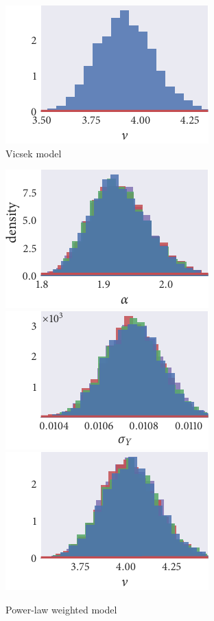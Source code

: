 \begin{figure}[p]
\begin{subfigure}[b]{\textwidth}
    \includegraphics{seq1/r_hist_nu.pdf}
    \caption{Vicsek model}
  \end{subfigure}
  \begin{subfigure}[b]{\textwidth}
    \includegraphics{seq1/power_hist_alpha.pdf}%
    \includegraphics{seq1/power_hist_sigma_Y.pdf}%
    \includegraphics{seq1/power_hist_nu.pdf}
    \caption{Power-law weighted model}
  \end{subfigure}
  \begin{subfigure}[b]{\textwidth}

\end{subfigure}
\end{figure}
